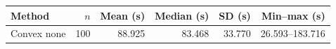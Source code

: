 \begin{tabular}{lrrrrr}\toprule
Method & $n$ & Mean (s) & Median (s) & SD (s) & Min--max (s) \\ \midrule
Convex none & 100 & 88.925 & 83.468 & 33.770 & 26.593--183.716 \\
\bottomrule\end{tabular}

